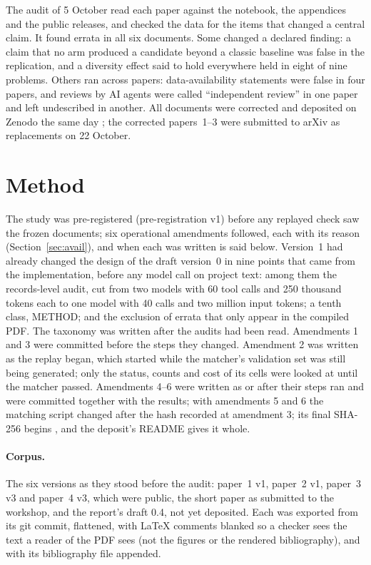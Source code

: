 \documentclass[11pt]{article}
\begin{document}
The audit of 5 October read each paper against the notebook, the appendices and the public releases, and checked the data for the
items that changed a central claim. It found errata in all six documents. Some changed a declared finding: a claim that no arm
produced a candidate beyond a classic baseline was false in the replication, and a diversity effect said to hold everywhere held in
eight of nine problems. Others ran across papers: data-availability statements were false in four papers, and reviews by AI agents
were called ``independent review'' in one paper and left undescribed in another. All documents were corrected and deposited on Zenodo the same day
\citep{ono2026paper1,ono2026paper2,ono2026paper3,ono2026paper4,ono2026paper6,ono2026short}; the corrected papers~1--3 were
submitted to arXiv as replacements on 22 October.

\section{Method}
\label{sec:method}

The study was pre-registered (pre-registration v1) before any replayed check saw the frozen documents; six operational
amendments followed, each with its reason (Section~\ref{sec:avail}), and when each was written is said below. Version~1 had already changed the design of the draft version~0 in nine
points that came from the implementation, before any model call on project text: among them the records-level audit, cut from two models with 60
tool calls and 250 thousand tokens each to one model with 40 calls and two million input tokens; a tenth class, METHOD; and the
exclusion of errata that only appear in the compiled PDF. The taxonomy was written after the audits had been read. Amendments 1 and 3 were committed before the steps they changed.
Amendment 2 was written as the replay began, which started while the matcher's validation set was still being generated; only
the status, counts and cost of its cells were looked at until the matcher passed. Amendments 4--6 were written as or after their
steps ran and were committed together with the results; with amendments 5 and 6 the matching script changed after the hash recorded
at amendment 3; its final SHA-256 begins \texttt{\JudgingHashFinal}, and the deposit's README gives it whole.

\paragraph{Corpus.} The six versions as they stood before the audit: paper~1 v1, paper~2 v1, paper~3 v3 and paper~4 v3, which
were public, the short paper as submitted to the workshop, and the report's draft 0.4, not yet deposited. Each was exported from its git commit, flattened, with LaTeX
comments blanked so a checker sees the text a reader of the PDF sees (not the figures or the rendered bibliography), and with
its bibliography file appended.
\end{document}

